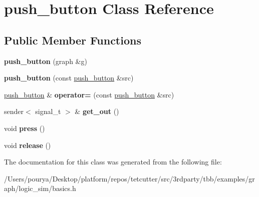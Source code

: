 \hypertarget{classpush__button}{}\section{push\+\_\+button Class Reference}
\label{classpush__button}
\subsection*{Public Member Functions}
\begin{DoxyCompactItemize}
\item 
\hypertarget{classpush__button_aad4a63f557f728b0ee02b716c84e4cb2}{}{\bfseries push\+\_\+button} (graph \&g)\label{classpush__button_aad4a63f557f728b0ee02b716c84e4cb2}

\item 
\hypertarget{classpush__button_abf145afdb0592adad9ce350ae4c894d4}{}{\bfseries push\+\_\+button} (const \hyperlink{classpush__button}{push\+\_\+button} \&src)\label{classpush__button_abf145afdb0592adad9ce350ae4c894d4}

\item 
\hypertarget{classpush__button_aa3c1c0d74539a0ea3e16aa71c618a853}{}\hyperlink{classpush__button}{push\+\_\+button} \& {\bfseries operator=} (const \hyperlink{classpush__button}{push\+\_\+button} \&src)\label{classpush__button_aa3c1c0d74539a0ea3e16aa71c618a853}

\item 
\hypertarget{classpush__button_a7478bcffc42aa7f433416424d45fbea1}{}sender$<$ signal\+\_\+t $>$ \& {\bfseries get\+\_\+out} ()\label{classpush__button_a7478bcffc42aa7f433416424d45fbea1}

\item 
\hypertarget{classpush__button_a3032ba4b6343127475906b1a48a6668f}{}void {\bfseries press} ()\label{classpush__button_a3032ba4b6343127475906b1a48a6668f}

\item 
\hypertarget{classpush__button_a6219df300d0d09c4d388a34179f24a24}{}void {\bfseries release} ()\label{classpush__button_a6219df300d0d09c4d388a34179f24a24}

\end{DoxyCompactItemize}


The documentation for this class was generated from the following file\+:\begin{DoxyCompactItemize}
\item 
/\+Users/pourya/\+Desktop/platform/repos/tetcutter/src/3rdparty/tbb/examples/graph/logic\+\_\+sim/basics.\+h\end{DoxyCompactItemize}
